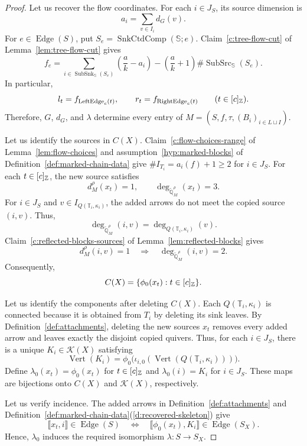\begin{proof}
Let us recover the flow coordinates.
For each $i\in J_{S}$, its source dimension is
\[
 a_i=\sum_{v\in I_i}d_G(v).
\]
For $e\in\operatorname{Edge}(S)$, put $S_e=\operatorname{SnkCtdComp}(\mathbb S;e)$.
Claim~\ref{c:tree-flow-cut} of Lemma~\ref{lem:tree-flow-cut} gives
\[
 f_e=\sum_{i\in \operatorname{SubSnk}_{\mathbb S}(S_e)}\left(\frac ak-a_i\right)
      -\left(\frac ak+1\right)\#\operatorname{SubSrc}_{\mathbb S}(S_e).
\]
In particular,
\[
 l_t=f_{\operatorname{LeftEdge}_c(t)},\qquad
 r_t=f_{\operatorname{RightEdge}_c(t)}\qquad(t\in[c]_{\mathbb Z}).
\]
Therefore, $G$, $d_G$, and $\lambda$ determine every entry of $M=(S,f,\tau,(B_i)_{i\in L\sqcup I})$.

 Let us identify the sources in $C(X)$.
Claim~\ref{c:flow-choices-range} of Lemma~\ref{lem:flow-choices} and assumption~\ref{hyp:marked-blocks} of Definition~\ref{def:marked-chain-data} give $\#I_{T_i}=a_i(f)+1\ge2$ for $i\in J_S$.
For each $t\in[c]_{\mathbb Z}$, the new source satisfies
\[
 d_M^\rho(x_t)=1,\qquad \deg_{\widetilde{\mathbb Q}_M^\rho}(x_t)=3.
\]
For $i\in J_S$ and $v\in I_{Q(\mathbb T_i,\kappa_i)}$, the added arrows do not meet the copied source $(i,v)$.
Thus,
\[
 \deg_{\widetilde{\mathbb Q}_M^\rho}(i,v)
 =\deg_{Q(\mathbb T_i,\kappa_i)}(v).
\]
Claim~\ref{c:reflected-blocks-sources} of Lemma~\ref{lem:reflected-blocks} gives
\[
 d_M^\rho(i,v)=1\quad\Longrightarrow\quad
 \deg_{\widetilde{\mathbb Q}_M^\rho}(i,v)=2.
\]
Consequently,
\[
 C(X)=\{\phi_0(x_t):t\in[c]_{\mathbb Z}\}.
\]

Let us identify the components after deleting $C(X)$.
Each $Q(\mathbb T_i,\kappa_i)$ is connected because it is obtained from $T_i$ by deleting its sink leaves.
By Definition~\ref{def:attachments}, deleting the new sources $x_t$ removes every added arrow and leaves exactly the disjoint copied quivers.
Thus, for each $i\in J_S$, there is a unique $K_i\in\mathcal K(X)$ satisfying
\[
 \operatorname{Vert}(K_i)=\phi_0\bigl(\iota_{i,0}(\operatorname{Vert}(Q(\mathbb T_i,\kappa_i)))\bigr).
\]
Define $\lambda_0(x_t)=\phi_0(x_t)$ for $t\in[c]_{\mathbb Z}$ and $\lambda_0(i)=K_i$ for $i\in J_S$.
These maps are bijections onto $C(X)$ and $\mathcal K(X)$, respectively.

Let us verify incidence.
The added arrows in Definition~\ref{def:attachments} and Definition~\ref{def:marked-chain-data}(\ref{d:recovered-skeleton}) give
\[
 \llbracket x_t,i\rrbracket\in\operatorname{Edge}(S)
 \quad\Longleftrightarrow\quad
 \llbracket\phi_0(x_t),K_i\rrbracket\in\operatorname{Edge}(S_X).
\]
Hence, $\lambda_0$ induces the required isomorphism $\lambda:S\to S_X$.
\end{proof}

